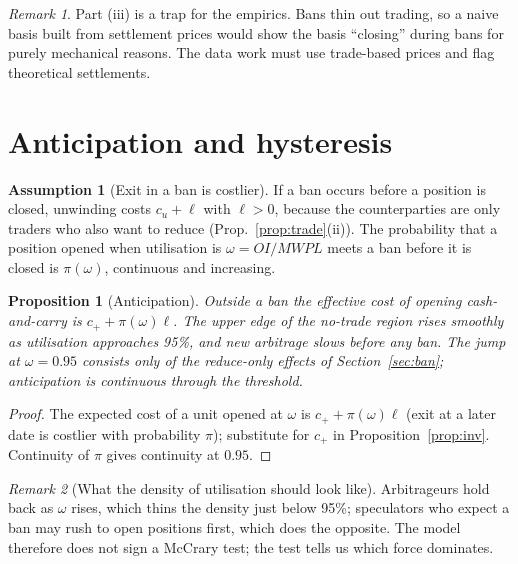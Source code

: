 \documentclass[11pt,a4paper]{article}
\theoremstyle{plain}
\newtheorem{proposition}{Proposition}
\theoremstyle{definition}
\newtheorem{assumption}{Assumption}
\theoremstyle{remark}
\newtheorem*{remark}{Remark}
\begin{document}
\begin{remark}
Part (iii) is a trap for the empirics. Bans thin out trading, so a naive basis built from settlement prices would show the
basis ``closing'' during bans for purely mechanical reasons. The data work must use trade-based prices and flag
theoretical settlements.
\end{remark}

\section{Anticipation and hysteresis}\label{sec:antic}
\begin{assumption}[Exit in a ban is costlier]\label{as:exit}
If a ban occurs before a position is closed, unwinding costs $c_u+\ell$ with $\ell>0$, because the counterparties are only
traders who also want to reduce (Prop.~\ref{prop:trade}(ii)). The probability that a position opened when utilisation is
$\omega=OI/MWPL$ meets a ban before it is closed is $\pi(\omega)$, continuous and increasing.
\end{assumption}

\begin{proposition}[Anticipation]\label{prop:antic}
Outside a ban the effective cost of opening cash-and-carry is $c_+ + \pi(\omega)\ell$. The upper edge of the no-trade
region rises smoothly as utilisation approaches 95\%, and new arbitrage slows before any ban. The jump at $\omega=0.95$
consists only of the reduce-only effects of Section~\ref{sec:ban}; anticipation is continuous through the threshold.
\end{proposition}
\begin{proof}
The expected cost of a unit opened at $\omega$ is $c_++\pi(\omega)\ell$ (exit at a later date is costlier with probability
$\pi$); substitute for $c_+$ in Proposition~\ref{prop:inv}. Continuity of $\pi$ gives continuity at $0.95$.
\end{proof}

\begin{remark}[What the density of utilisation should look like]
Arbitrageurs hold back as $\omega$ rises, which thins the density just below 95\%; speculators who expect a ban may rush to
open positions first, which does the opposite. The model therefore does not sign a McCrary test; the test tells us which
force dominates.
\end{remark}
\end{document}
